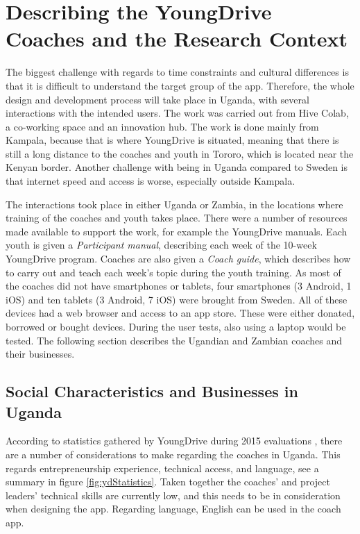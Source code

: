 \section{Describing the YoungDrive Coaches and the Research Context}

The biggest challenge with regards to time constraints and cultural differences is that it is difficult to understand the target group of the app. Therefore, the whole design and development process will take place in Uganda, with several interactions with the intended users. The work was carried out from Hive Colab, a co-working space and an innovation hub. The work is done mainly from Kampala, because that is where YoungDrive is situated, meaning that there is still a long distance to the coaches and youth in Tororo, which is located near the Kenyan border. Another challenge with being in Uganda compared to Sweden is that internet speed and access is worse, especially outside Kampala.

 The interactions took place in either Uganda or Zambia, in the locations where training of the coaches and youth takes place.  There were a number of resources made available to support the work, for example the YoungDrive manuals. Each youth is given a \textit{Participant manual}, describing each week of the 10-week YoungDrive program. Coaches are also given a \textit{Coach guide}, which describes how to carry out and teach each week's topic during the youth training. As most of the coaches did not have smartphones or tablets, four smartphones (3 Android, 1 iOS) and ten tablets (3 Android, 7 iOS) were brought from Sweden. All of these devices had a web browser and access to an app store. These were either donated, borrowed or bought devices. During the user tests, also using a laptop would be tested. The following section describes the Ugandian and Zambian coaches and their businesses.

\subsection{Social Characteristics and Businesses in Uganda}

According to statistics gathered by YoungDrive during 2015 evaluations \citep{youngdrive-statistics}, there are a number of considerations to make regarding the coaches in Uganda. This regards entrepreneurship experience, technical access, and language, see a summary in figure \ref{fig:ydStatistics}. Taken together the coaches' and project leaders' technical skills are currently low, and this needs to be in consideration when designing the app. Regarding language, English can be used in the coach app.

